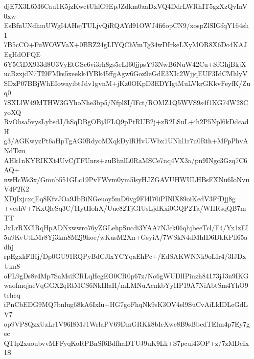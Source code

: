 djE7X3L6M6Cau1K5jzKwctUhlG9EpJZdkm0aaDxVQ4DdrLWRhIT5gzXzQvInV0xw
EsBfnUNdhmUWgI4AHejTULjvQiRQAYd91OWJ4fi6opCN9/xospZlSIGfqY164sh1
7B5cCO+FuWOWVaX+0BBZ24gLIYQChVmTg34wDIrkeLXyMOR8X6Do4KAJEgHdOFQE
6Y5CiDX933d8U3VyEtGSc6vi3rh8gs5eLI60jjpsY93NwB6NuW42Cu+SfGhjBkjX
ucBzxjdN7TI9FMks5xeekk4YBk45ffgAgw6Goz9eGdE3XIc2WjjqEUF3IdCMhlyV
SDzP07BBjWhEIowayibtJdv1gvnM+jKz0OKpD3EDYIgtMuLVkrGKkvFeyfK/Zuq0
7SXLlW49MTHW3GYhoNhe3bp5/Nfpl8I/lFct/ROMZ1Q5WVS9s4f1KG74W28CyoXQ
RvOhsa5vysLybsdJ/hSqDBgOBj3FLQ9pPtRUB2j+zR2LSuL+ih2P5Npl6kDdcadH
g3/AGKwyzPt6aHpTgAG0RdyoMXqkDylRHvUWbx1UNhl1r7n0Rth+MFpPhvANdTsm
AHk1nKYRIKXt4UvCjTFUnrs+zuBhnlL0RaMSCe7nq4VX3a/pn9INgc3Gzq7C6AQ+
nwHcWs3x/Gmnb551GLc19PvFWvm0ym5lsyHJZGAVUHWULHBsFXNu6IoNvuV4F2K2
XDjIxjcxqEq8KfvJOa9JbBiNGeuoy5mD6vg9Fl4l70iPINlX89oiKedV3FfDjj8g
+veshV+7KxQleSq3C/1IytIIohX/Uue82TjGIUsLjdKxi0GQP2Ta/WHRsqQB7mTT
JxLrRXClRqHpADNxwwro76yZGLehpSucdi3YAA7NJck06qhjbeeTcl/F4/Yx1zEI
5u9KvUtLMr8Yj3km8M2j9hoe/wKusM2Xn+GsyiA/7WSkN4dMhID6DkKPll65adhj
rpEgxkFlHj/Dp0GU91RQPyBdCJlxYCYqaEhPc+/EdSAKWNNk9oLIr4/3IJDxUkn8
oFL9gDs8r4Mp7SaMsifCRLqHcgEO0CR0p67z/No6gWUDlIPinzh84173jJ3n9IKG
waofmqjaeVqGGX2qRtMCS6NkHlaH/mLMNuAcnkbYyHP19A7NiAbtSm4YhO9tehcq
iPnCbEDG9MQ7bnlug68kA6Ixlu+HG7goFhqNk9sK3OV4el9SuCvAiLkIDLeGdLV7
op9VP8QzxUzLr1V96I8MJ1WrlaPV69DmGRKk8bIeXwc8B9sBbedTElm4p7Ey7gec
QTlp2xuoubvvMFFyqKoRPBnSf6BdfhaDTUJ9uK9Lk+S7pcui43OP+z/7zMDcIx1S
